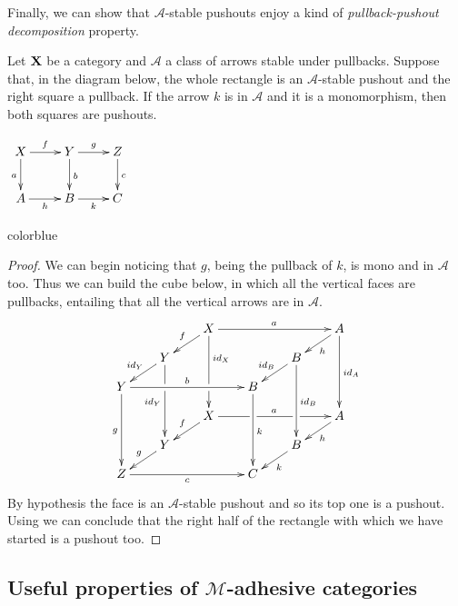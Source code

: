 \documentclass[a4paper,UKenglish,cleveref,pdftex, thm-restate,numberwithinsect,anonymous]{lipics}
\newcommand{\full}[1]{{color{blue}#1}}
\newcommand{\full}[1]{}
\newcommand{\id}[1]{\mathsf{id}_{#1}}
\def\X{\textbf {\textup{X}}}
\def\Y{\textbf {\textup{Y}}}
\begin{document}
Finally, we can show that $\mathcal{A}$-stable pushouts enjoy a kind of \emph{pullback-pushout decomposition} property.

\noindent 
\parbox{10cm}{
\begin{proposition}\label{prop:stab}Let $\X$ be a category and $\mathcal{A}$ a class of arrows stable under pullbacks. Suppose that, in the diagram below, the whole rectangle is an $\mathcal{A}$-stable pushout and the right square a pullback. If the arrow $k$ is in $\mathcal{A}$ and it is a monomorphism,  then both squares are pushouts.
\end{proposition}}
\parbox{4cm}{\vspace{-.3cm}
	$\xymatrix{X \ar[d]_{a} \ar[r]^{f}& \ar[r]^{g} Y \ar[d]^{b}& Z \ar[d]^{c}\\ A \ar[r]_{h}& B \ar[r]_{k}& C}$}

\full{ 
\begin{proof}
	We can begin noticing that $g$, being the pullback of $k$, is mono and in $\mathcal{A}$ too. Thus we can build the cube below, in which all the vertical faces are pullbacks, entailing that all the vertical arrows are in $\mathcal{A}$.
	\[\xymatrix@C=20pt@R=10pt{ & &X\ar[dl]_{f} \ar[ddd]^(.333333){\id{X}}|(.666666)\hole\ar[rrr]^{a} &&&A \ar[ddd]^{\id{A}} \ar[dl]^{h}\\& Y\ar[dl]_{\id{Y}} \ar[ddd]|(.333333)\hole_{\id{Y}} &&&B \ar[ddd]^{\id{B}} \ar[dl]_{\id{B}} \\Y \ar[ddd]_{g} \ar[rrr]^{b}&&& B\ar[ddd]^{k}\\&&X \ar[rrr]|(.34)\hole^{a}|(.67)\hole \ar[dl]_{f}&&& A \ar[dl]^{h}\\ & Y  \ar[dl]_{g}&&& B \ar[dl]^{k}\\ Z\ar[rrr]_{c} &&& C}\]
	By hypothesis the face is an $\mathcal{A}$-stable pushout and so its top one is a pushout. Using \Cref{lem:po1} we can conclude that the right half of the rectangle with which we have started is a pushout too.
\end{proof}}

\subsection{Useful properties of $\mathcal{M}$-adhesive categories}
\end{document}
